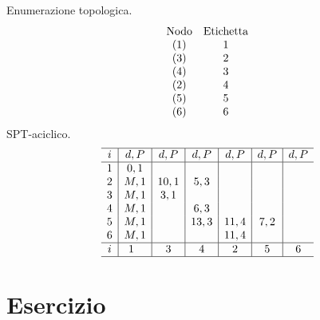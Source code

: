 \documentclass[10pt,a4paper,twoside,openright]{book}
\newcounter{es}
\newcommand{\Es}{
	\stepcounter{es}
	\section{Esercizio \arabic{es}}
	}
\numberwithin{es}{chapter}
\begin{document}
Enumerazione topologica.
\begin{equation*}
\begin{array}{ c c }
\text{Nodo} & \text{Etichetta}\\
( 1) & 1\\
( 3) & 2\\
( 4) & 3\\
( 2) & 4\\
( 5) & 5\\
( 6) & 6
\end{array}
\end{equation*}
SPT-aciclico.
\begin{equation*}
\begin{array}{ c|c|c|c|c|c|c }
\hline
i & d,P & d,P & d,P & d,P & d,P & d,P\\
\hline
1 & 0,1 &  &  &  &  & \\
2 & M,1 & 10,1 & 5,3 &  &  & \\
3 & M,1 & 3,1 &  &  &  & \\
4 & M,1 &  & 6,3 &  &  & \\
5 & M,1 &  & 13,3 & 11,4 & 7,2 & \\
6 & M,1 &  &  & 11,4 &  & \\
\hline
i & 1\ \  & 3 & 4 & 2 & 5 & 6\\
\hline
\end{array}
\end{equation*}


\Es
\end{document}
